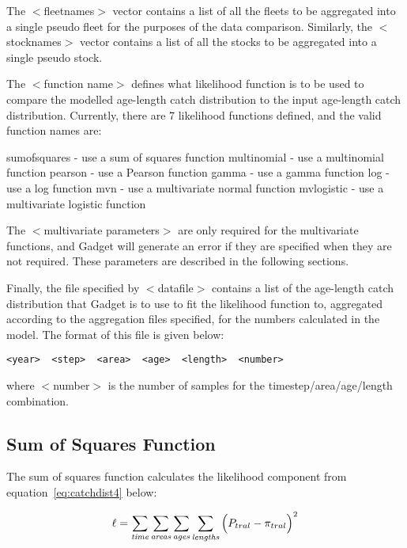 \documentclass[10pt,twoside]{book}
\begin{document}
\bigskip
The $<$fleetnames$>$ vector contains a list of all the fleets to be aggregated into a single pseudo fleet for the purposes of the data comparison.  Similarly, the $<$stocknames$>$ vector contains a list of all the stocks to be aggregated into a single pseudo stock.

\bigskip
The $<$function name$>$ defines what likelihood function is to be used to compare the modelled age-length catch distribution to the input age-length catch distribution.  Currently, there are 7 likelihood functions defined, and the valid function names are:

\bigskip
sumofsquares - use a sum of squares function\newline
multinomial - use a multinomial function\newline
pearson - use a Pearson function\newline
gamma - use a gamma function\newline
log - use a log function\newline
mvn - use a multivariate normal function\newline
mvlogistic - use a multivariate logistic function

\bigskip
The $<$multivariate parameters$>$ are only required for the multivariate functions, and Gadget will generate an error if they are specified when they are not required.  These parameters are described in the following sections.

\bigskip
Finally, the file specified by $<$datafile$>$ contains a list of the age-length catch distribution that Gadget is to use to fit the likelihood function to, aggregated according to the aggregation files specified, for the numbers calculated in the model.  The format of this file is given below:

{\small\begin{verbatim}
<year>  <step>  <area>  <age>  <length>  <number>
\end{verbatim}}

where $<$number$>$ is the number of samples for the timestep/area/age/length combination.

\subsection{Sum of Squares Function}
The sum of squares function calculates the likelihood component from equation~\ref{eq:catchdist4} below:

\begin{equation}\label{eq:catchdist4}
\ell = \sum_{\it time}\sum_{\it areas}\sum_{\it ages}\sum_{\it lengths} \Big( P_{tral} - \pi_{tral} \Big) ^2
\end{equation}
\end{document}
